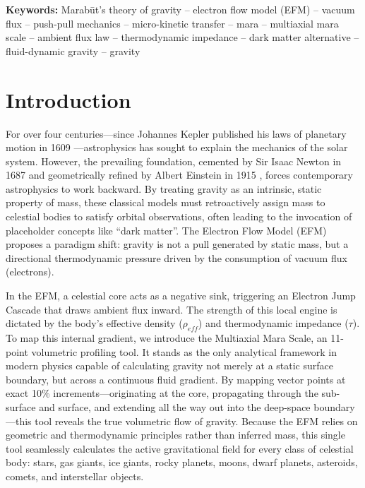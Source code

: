 \documentclass[11pt, a4paper]{article}
\begin{document}
\vspace{0.5em}

\noindent \textbf{Keywords:} Marab\={u}t's theory of gravity -- electron flow model (EFM) -- vacuum flux -- push-pull mechanics -- micro-kinetic transfer -- mara -- multiaxial mara scale -- ambient flux law -- thermodynamic impedance -- dark matter alternative -- fluid-dynamic gravity -- gravity

\section{Introduction}
  For over four centuries—since Johannes Kepler published his laws of planetary motion in 1609 \cite{kepler1609}—astrophysics has sought to explain the mechanics of the solar system. However, the prevailing foundation, cemented by Sir Isaac Newton in 1687 \cite{newton1687} and geometrically refined by Albert Einstein in 1915 \cite{einstein1915}, forces contemporary astrophysics to work backward. By treating gravity as an intrinsic, static property of mass, these classical models must retroactively assign mass to celestial bodies to satisfy orbital observations, often leading to the invocation of placeholder concepts like ``dark matter''. The Electron Flow Model (EFM) proposes a paradigm shift: gravity is not a pull generated by static mass, but a directional thermodynamic pressure driven by the consumption of vacuum flux (electrons).
  
  In the EFM, a celestial core acts as a negative sink, triggering an Electron Jump Cascade that draws ambient flux inward. The strength of this local engine is dictated by the body's effective density ($\rho_{eff}$) and thermodynamic impedance ($\tau$). To map this internal gradient, we introduce the Multiaxial Mara Scale, an 11-point volumetric profiling tool. It stands as the only analytical framework in modern physics capable of calculating gravity not merely at a static surface boundary, but across a continuous fluid gradient. By mapping vector points at exact 10\% increments—originating at the core, propagating through the sub-surface and surface, and extending all the way out into the deep-space boundary—this tool reveals the true volumetric flow of gravity. Because the EFM relies on geometric and thermodynamic principles rather than inferred mass, this single tool seamlessly calculates the active gravitational field for every class of celestial body: stars, gas giants, ice giants, rocky planets, moons, dwarf planets, asteroids, comets, and interstellar objects.
  
\end{document}
